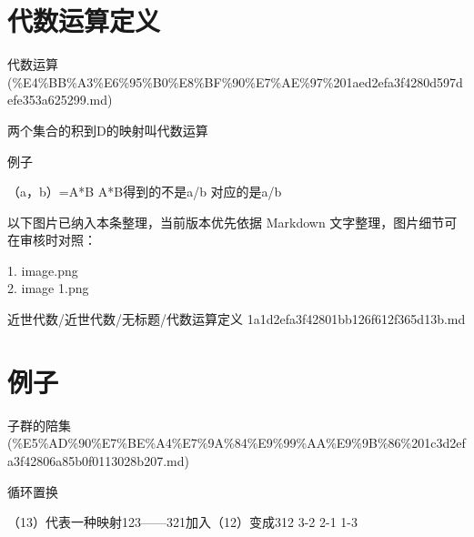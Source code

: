 \section*{代数运算定义}

\begin{note}[来源上级主题]

代数运算 (\%E4\%BB\%A3\%E6\%95\%B0\%E8\%BF\%90\%E7\%AE\%97\%201aed2efa3f4280d597defe353a625299.md)

\end{note}

\begin{definition}[代数运算定义]

两个集合的积到D的映射叫代数运算

例子

（a，b）=A*B A*B得到的不是a/b 对应的是a/b

\end{definition}

\begin{note}[关联图片]
以下图片已纳入本条整理，当前版本优先依据 Markdown 文字整理，图片细节可在审核时对照：

1. image.png\\
2. image 1.png\\

\end{note}

\begin{note}[来源路径]

近世代数/近世代数/无标题/代数运算定义 1a1d2efa3f42801bb126f612f365d13b.md

\end{note}

\section*{例子}

\begin{note}[来源上级主题]

子群的陪集 (\%E5\%AD\%90\%E7\%BE\%A4\%E7\%9A\%84\%E9\%99\%AA\%E9\%9B\%86\%201c3d2efa3f42806a85b0f0113028b207.md)

\end{note}

\begin{example}[例子]

循环置换

（13）代表一种映射123——321加入（12）变成312 3-2 2-1 1-3

\end{example}

